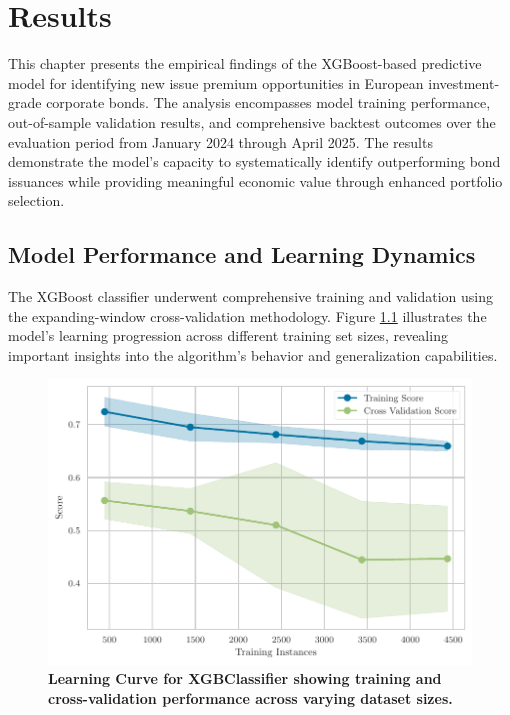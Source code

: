 \chapter{Results}
\label{ch:results}

This chapter presents the empirical findings of the XGBoost-based predictive model for identifying new issue premium opportunities in European investment-grade corporate bonds. The analysis encompasses model training performance, out-of-sample validation results, and comprehensive backtest outcomes over the evaluation period from January 2024 through April 2025. The results demonstrate the model's capacity to systematically identify outperforming bond issuances while providing meaningful economic value through enhanced portfolio selection.

\section{Model Performance and Learning Dynamics}

The XGBoost classifier underwent comprehensive training and validation using the expanding-window cross-validation methodology. Figure \ref{fig:learning_curve} illustrates the model's learning progression across different training set sizes, revealing important insights into the algorithm's behavior and generalization capabilities.

\begin{figure}[h]
    \begin{center}
        \includegraphics[width=\textwidth]{images/learning_curve.pdf}
    \end{center}
    \caption{\textbf{Learning Curve for XGBClassifier showing training and cross-validation performance across varying dataset sizes.}}
    \label{fig:learning_curve}
\end{figure}

